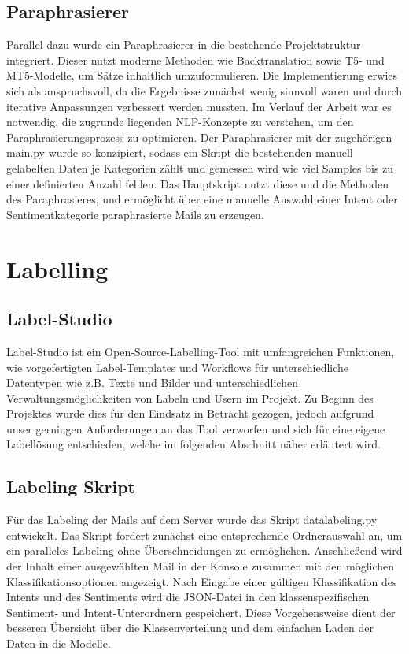 \subsection{Paraphrasierer}
Parallel dazu wurde ein Paraphrasierer in die bestehende Projektstruktur integriert. Dieser nutzt
moderne Methoden wie Backtranslation sowie T5- und MT5-Modelle, um Sätze inhaltlich
umzuformulieren. Die Implementierung erwies sich als anspruchsvoll, da die Ergebnisse zunächst
wenig sinnvoll waren und durch iterative Anpassungen verbessert werden mussten. Im Verlauf der
Arbeit war es notwendig, die zugrunde liegenden NLP-Konzepte zu verstehen, um den
Paraphrasierungsprozess zu optimieren. Der Paraphrasierer mit der zugehörigen main.py wurde
so konzipiert, sodass ein Skript die bestehenden manuell gelabelten Daten je Kategorien
zählt und gemessen wird wie viel Samples bis zu einer definierten Anzahl fehlen.
Das Hauptskript nutzt diese und die Methoden des Paraphrasieres, und ermöglicht
über eine manuelle Auswahl einer Intent oder Sentimentkategorie paraphrasierte Mails zu erzeugen. 

\section{Labelling}

\subsection{Label-Studio}
Label-Studio ist ein Open-Source-Labelling-Tool mit umfangreichen Funktionen,
wie vorgefertigten Label-Templates und Workflows für unterschiedliche Datentypen
wie z.B. Texte und Bilder und unterschiedlichen Verwaltungsmöglichkeiten von Labeln
und Usern im Projekt. Zu Beginn des Projektes wurde dies für den Eindsatz in Betracht
gezogen, jedoch aufgrund unser gerningen Anforderungen an das Tool  verworfen und sich für
eine eigene Labellösung entschieden, welche im folgenden Abschnitt näher erläutert wird.  

\subsection{Labeling Skript}
Für das Labeling der Mails auf dem Server wurde das Skript data\textunderscore labeling.py
entwickelt. Das Skript fordert zunächst eine entsprechende Ordnerauswahl an, um ein
paralleles Labeling ohne Überschneidungen zu ermöglichen. Anschließend wird der Inhalt einer
ausgewählten Mail in der Konsole zusammen mit den möglichen Klassifikationsoptionen
angezeigt. Nach Eingabe einer gültigen Klassifikation des Intents und des Sentiments
wird die JSON-Datei in den klassenspezifischen Sentiment- und Intent-Unterordnern
gespeichert. Diese Vorgehensweise dient der besseren Übersicht über die Klassenverteilung
und dem einfachen Laden der Daten in die Modelle. 



